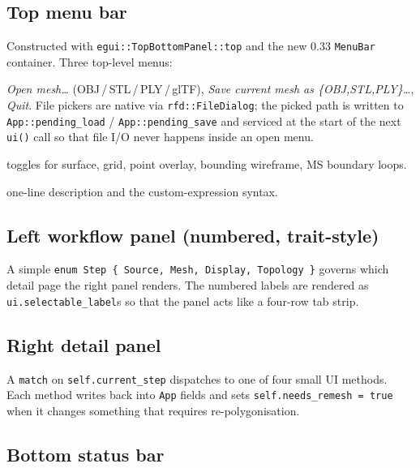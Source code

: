 \documentclass[11pt]{article}
\begin{document}
\subsection{Top menu bar}

Constructed with \texttt{egui::TopBottomPanel::top} and the new 0.33
\texttt{MenuBar} container.  Three top-level menus:
\begin{description}[style=nextline]
  \item[File] \emph{Open mesh\ldots} (OBJ\,/\,STL\,/\,PLY\,/\,glTF),
              \emph{Save current mesh as \{OBJ,STL,PLY\}\ldots},
              \emph{Quit}.
              File pickers are native via \texttt{rfd::FileDialog};
              the picked path is written to
              \lstinline|App::pending_load| /
              \lstinline|App::pending_save| and serviced at the
              start of the next \lstinline|ui()| call so that file
              I/O never happens inside an open menu.
  \item[View] toggles for surface, grid, point overlay, bounding
              wireframe, MS boundary loops.
  \item[Help] one-line description and the custom-expression syntax.
\end{description}

\subsection{Left workflow panel (numbered, trait-style)}

A simple \lstinline|enum Step { Source, Mesh, Display, Topology }|
governs which detail page the right panel renders.
The numbered labels are rendered as \texttt{ui.selectable\_label}s so
that the panel acts like a four-row tab strip.

\subsection{Right detail panel}

A \texttt{match} on \lstinline|self.current_step| dispatches to one of
four small UI methods.  Each method writes back into \lstinline|App|
fields and sets \lstinline|self.needs_remesh = true| when it changes
something that requires re-polygonisation.

\subsection{Bottom status bar}
\end{document}
